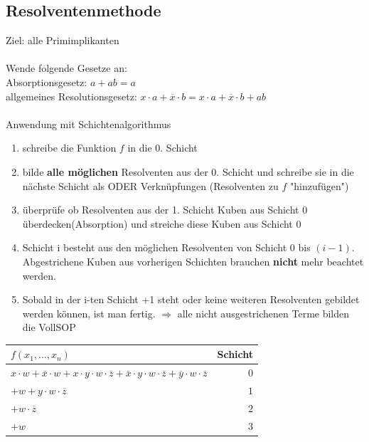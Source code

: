 \documentclass[6pt,a4paper]{scrartcl}
\newcommand{\Ra}[0]{\ensuremath{\Rightarrow}}									%
\begin{document}
\begin{multicols*}{3}
	\subsection{Resolventenmethode} %
	\label{sec:Resolventenmethode}
		Ziel: alle Primimplikanten \\ \\
		Wende folgende Gesetze an: \\
		Absorptionsgesetz: $a + ab = a$ \\
		allgemeines Resolutionsgesetz: $x \cdot a + \overline x \cdot b = x \cdot a + \overline x \cdot b + ab$ \\
		\\
		Anwendung mit Schichtenalgorithmus
		\begin{enumerate}
			\item schreibe die Funktion $f$ in die 0. Schicht
			\item bilde \textbf{alle möglichen} Resolventen aus der 0. Schicht und schreibe sie in die nächste Schicht als ODER Verknüpfungen (Resolventen zu $f$ "hinzufügen")
			\item überprüfe ob Resolventen aus der 1. Schicht Kuben aus Schicht 0 überdecken(Absorption) und streiche diese Kuben aus Schicht 0
			\item Schicht i besteht aus den möglichen Resolventen von Schicht 0 bis $(i-1)$. Abgestrichene Kuben aus vorherigen Schichten brauchen \textbf{nicht} mehr beachtet werden.
			\item Sobald in der i-ten Schicht +1 steht oder keine weiteren Resolventen gebildet werden können, ist man fertig.
			$\Ra $ alle nicht ausgestrichenen Terme bilden die VollSOP
		\end{enumerate}

		\begin{tabular}{l | r}
		$f(x_1, \ldots, x_n)$ & Schicht \\ \midrule
		$x \cdot w + \overline x \cdot w + x \cdot y \cdot w \cdot \overline z + \overline x \cdot y \cdot w \cdot \overline z + \overline y \cdot w \cdot \overline z $& $0$ \\
		$+ w + y \cdot w \cdot \overline z$ & $1$ \\
		$+ w \cdot \overline z $ & $2$ \\
		$+ w$ &$ 3$
		\end{tabular}


\end{multicols*}
\end{document}
